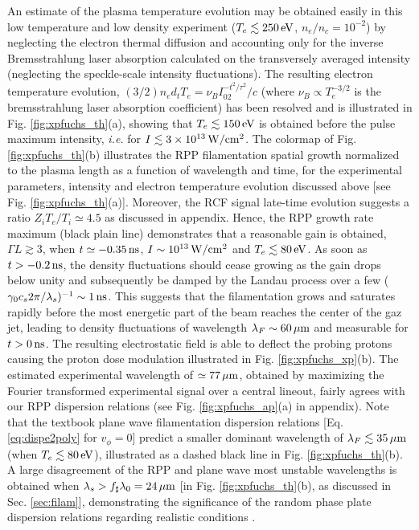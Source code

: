 \documentclass[
 reprint,
 superscriptaddress,
 amsmath,amssymb,
 aps,
]{revtex4-1}
\begin{document}
An estimate of the plasma temperature evolution may be obtained easily in this low temperature and low density experiment ($T_e\lesssim 250 \,\rm eV$, $n_e/n_c=10^{-2}$) by neglecting the electron thermal diffusion and accounting only for the inverse Bremsstrahlung laser absorption calculated on the transversely averaged intensity (neglecting the speckle-scale intensity fluctuations). The resulting electron temperature evolution, \mbox{$(3/2)n_e d_tT_e=\nu_BI_02^{-t^2/\tau^2}/c$} (where $\nu_B\propto T_e^{-3/2}$ is  the bremsstrahlung laser absorption coefficient) has been resolved and is illustrated in Fig. \ref{fig:xpfuchs_th}(a), showing that  $T_e\lesssim 150\, \rm eV $ is obtained  before the pulse maximum intensity, \emph{i.e.} for $I\lesssim 3\times 10^{13}\, \rm W/cm^2$. 
The colormap of Fig. \ref{fig:xpfuchs_th}(b) illustrates the RPP filamentation spatial  growth normalized to the plasma length  as a function of   wavelength and  time, for the experimental parameters, intensity and electron temperature evolution discussed above [see Fig. \ref{fig:xpfuchs_th}(a)].
Moreover, the RCF signal late-time evolution suggests a ratio  $Z_iT_e/T_i\simeq 4.5$ as discussed in appendix. Hence, the RPP growth rate maximum (black plain line) demonstrates that a reasonable gain is obtained,  $\Gamma L\gtrsim 3$, when $t\simeq -0.35\,\rm ns$, $I\sim  10^{13}\,\rm W/cm^2$ and  $T_e\lesssim 80\, \rm eV$.
As soon as $t>-0.2\, \rm ns$, the density fluctuations should cease growing as the gain drops below unity  and subsequently be damped by the Landau process over a few ($\gamma_0c_s2\pi/\lambda_s)^{-1} \sim 1\, \rm ns$.
This suggests that the filamentation grows and saturates rapidly before the most energetic part of the beam reaches the center of the gaz jet, leading to  density fluctuations of wavelength   $\lambda_F \sim 60 \,\rm\mu m$ and measurable for $t>0\,\rm ns$. The resulting electrostatic field is able to deflect the probing protons   causing the proton dose modulation illustrated in Fig. \ref{fig:xpfuchs_xp}(b). 
The estimated experimental wavelength of $\simeq 77 \,\rm\mu m$, obtained by maximizing the Fourier transformed experimental signal over a central lineout, fairly agrees with our RPP dispersion relations (see Fig. \ref{fig:xpfuchs_ap}(a)  in appendix). 
Note that the textbook plane wave filamentation dispersion relations [Eq. \eqref{eq:dispe2poly} for $v_\phi=0$] predict a  smaller dominant wavelength of $ \lambda_F\lesssim  35\, \rm\mu m$ (when $T_e\lesssim80\, \rm eV$), illustrated as a dashed black line in Fig. \ref{fig:xpfuchs_th}(b). A large disagreement of the  RPP and plane wave most unstable wavelengths is obtained when  $\lambda_s> f_\sharp\lambda_0=24\,\rm\mu m$ [in Fig. \ref{fig:xpfuchs_th}(b), as discussed in Sec. \ref{sec:filam}], demonstrating the significance of the random phase plate dispersion relations regarding realistic conditions \cite[]{Berger_98}.
\end{document}
